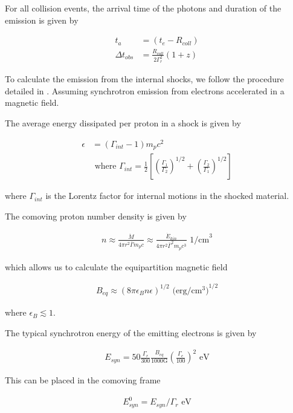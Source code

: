 \documentclass[linenumbers,twocolumn]{aastex631}
\begin{document}
For all collision events, the arrival time of the photons and duration of the emission is given by

\begin{align}
	t_a &= (t_e - R_{coll})\\
	\Delta t_{obs} &= \frac{R_{coll}}{2\Gamma_r^2} (1+z)
\end{align}

To calculate the emission from the internal shocks, we follow the procedure detailed in \citet{1998MNRAS.296..275D}. Assuming synchrotron emission from electrons accelerated in a magnetic field. 

The average energy dissipated per proton in a shock is given by

\begin{align}
	\epsilon &= (\Gamma_{int} - 1) m_p c^2 \\
	& \text{ where } \Gamma_{int} = \frac{1}{2}\left[\left(\frac{\Gamma_1}{\Gamma_2}\right)^{1/2} + \left(\frac{\Gamma_2}{\Gamma_1}\right)^{1/2}\right]
\end{align}

where $\Gamma_{int}$ is the Lorentz factor for internal motions in the shocked material.

The comoving proton number density is given by 

\begin{align}
	n \approx \frac{\dot{M}}{4\pi r^2 \bar{\Gamma}m_p c} \approx \frac{\dot{E}_{kin}}{4\pi r^2 \bar{\Gamma}^2m_p c^3} \text{ 1/cm}^3
\end{align}

which allows us to calculate the equipartition magnetic field 

\begin{align}
	B_{eq} \approx (8\pi \epsilon_B n \epsilon)^{1/2} \text{ (erg/cm$^3$)}^{1/2}
\end{align}

where $\epsilon_B\lesssim1$. 

The typical synchrotron energy of the emitting electrons is given by

\begin{align}
	E_{syn} = 50 \frac{\Gamma_r}{300}\frac{B_{eq}}{1000\text{G}}\left(\frac{\Gamma_e}{100}\right)^2 \text{ eV}
\end{align}

This can be placed in the comoving frame 

\begin{align}
	E_{syn}^0 = E_{syn}/\Gamma_r \text{ eV}
\end{align} 
\end{document}
